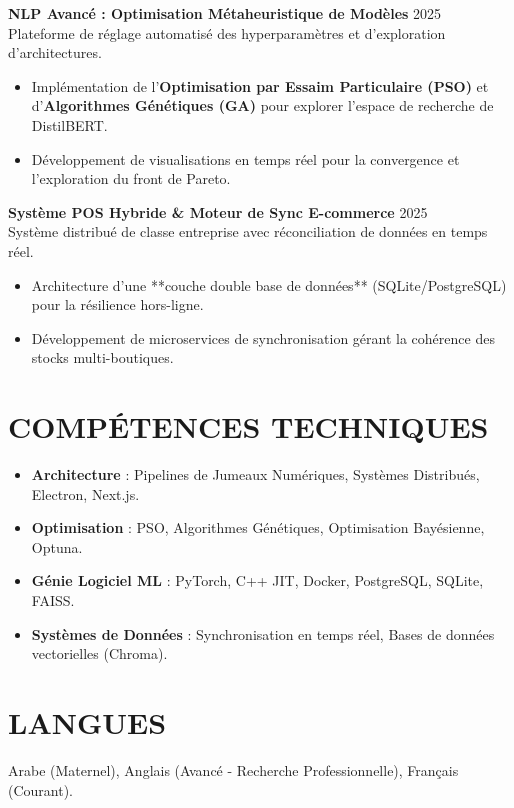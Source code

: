 \documentclass[a4paper,11pt]{article}
\begin{document}
\textbf{NLP Avancé : Optimisation Métaheuristique de Modèles} \hfill 2025 \\
Plateforme de réglage automatisé des hyperparamètres et d'exploration d'architectures.
\begin{itemize}
    \item Implémentation de l'\textbf{Optimisation par Essaim Particulaire (PSO)} et d'\textbf{Algorithmes Génétiques (GA)} pour explorer l'espace de recherche de DistilBERT.
    \item Développement de visualisations en temps réel pour la convergence et l'exploration du front de Pareto.
\end{itemize}

\textbf{Système POS Hybride \& Moteur de Sync E-commerce} \hfill 2025 \\
Système distribué de classe entreprise avec réconciliation de données en temps réel.
\begin{itemize}
    \item Architecture d'une **couche double base de données** (SQLite/PostgreSQL) pour la résilience hors-ligne.
    \item Développement de microservices de synchronisation gérant la cohérence des stocks multi-boutiques.
\end{itemize}

\section{COMPÉTENCES TECHNIQUES}
\begin{itemize}
    \item \textbf{Architecture} : Pipelines de Jumeaux Numériques, Systèmes Distribués, Electron, Next.js.
    \item \textbf{Optimisation} : PSO, Algorithmes Génétiques, Optimisation Bayésienne, Optuna.
    \item \textbf{Génie Logiciel ML} : PyTorch, C++ JIT, Docker, PostgreSQL, SQLite, FAISS.
    \item \textbf{Systèmes de Données} : Synchronisation en temps réel, Bases de données vectorielles (Chroma).
\end{itemize}

\section{LANGUES}
Arabe (Maternel), Anglais (Avancé - Recherche Professionnelle), Français (Courant).
\end{document}
